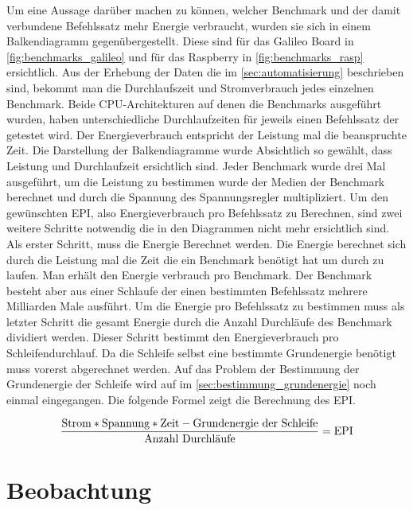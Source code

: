 Um eine Aussage darüber machen zu können, welcher Benchmark und der damit verbundene Befehlssatz mehr Energie verbraucht, wurden sie sich in einem Balkendiagramm gegenübergestellt. Diese sind für das Galileo Board in \autoref{fig:benchmarks_galileo} und für das Raspberry in \autoref{fig:benchmarks_rasp} ersichtlich. Aus der Erhebung der Daten die im \autoref{sec:automatisierung} beschrieben sind, bekommt man die Durchlaufszeit und Stromverbrauch jedes einzelnen Benchmark. Beide CPU-Architekturen auf denen die Benchmarks ausgeführt wurden, haben unterschiedliche Durchlaufzeiten für jeweils einen Befehlssatz der getestet wird. Der Energieverbrauch entspricht der Leistung mal die beanspruchte Zeit. Die Darstellung der Balkendiagramme wurde Absichtlich so gewählt, dass Leistung und Durchlaufzeit ersichtlich sind. Jeder Benchmark wurde drei Mal ausgeführt, um die Leistung zu bestimmen wurde der Medien der Benchmark berechnet und durch die Spannung des Spannungsregler multipliziert. Um den gewünschten EPI, also Energieverbrauch pro Befehlssatz zu Berechnen, sind zwei weitere Schritte notwendig die in den Diagrammen nicht mehr ersichtlich sind. Als erster Schritt, muss die Energie Berechnet werden. Die Energie berechnet sich durch die Leistung mal die Zeit die ein Benchmark benötigt hat um durch zu laufen. Man erhält den Energie verbrauch pro Benchmark. Der Benchmark besteht aber aus einer Schlaufe der einen bestimmten Befehlssatz mehrere Milliarden Male ausführt. Um die Energie pro Befehlssatz zu bestimmen muss als letzter Schritt die gesamt Energie durch die Anzahl Durchläufe des Benchmark dividiert werden. Dieser Schritt bestimmt den Energieverbrauch pro Schleifendurchlauf. Da die Schleife selbst eine bestimmte Grundenergie benötigt muss vorerst abgerechnet werden. Auf das Problem der Bestimmung der Grundenergie der Schleife wird auf im \autoref{sec:bestimmung_grundenergie} noch einmal eingegangen. Die folgende Formel zeigt die Berechnung des EPI.

\[ \frac{\textnormal{Strom} * \textnormal{Spannung} * \textnormal{Zeit} - \textnormal{Grundenergie der Schleife}}{\textnormal{Anzahl Durchl{\"a}ufe}} = \textnormal{EPI} \]









\section{Beobachtung}

